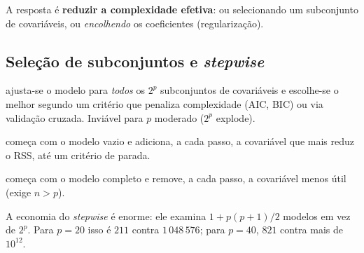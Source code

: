 \documentclass[11pt,a4paper]{article}
\begin{document}
A resposta é \textbf{reduzir a complexidade efetiva}: ou selecionando um
subconjunto de covariáveis, ou \emph{encolhendo} os coeficientes (regularização).

\subsection{Seleção de subconjuntos e \emph{stepwise}}
\begin{description}[leftmargin=2.4cm,style=nextline]
  \item[Melhor subconjunto] ajusta-se o modelo para \emph{todos} os $2^p$
        subconjuntos de covariáveis e escolhe-se o melhor segundo um critério que
        penaliza complexidade (AIC, BIC) ou via validação cruzada. Inviável para
        $p$ moderado ($2^p$ explode).
  \item[\emph{Forward stepwise}] começa com o modelo vazio e adiciona, a cada
        passo, a covariável que mais reduz o RSS, até um critério de parada.
  \item[\emph{Backward stepwise}] começa com o modelo completo e remove, a cada
        passo, a covariável menos útil (exige $n>p$).
\end{description}

A economia do \emph{stepwise} é enorme: ele examina $1+p(p+1)/2$ modelos em vez de
$2^p$. Para $p=20$ isso é $211$ contra $1\,048\,576$; para $p=40$, $821$ contra
mais de $10^{12}$.
\end{document}
